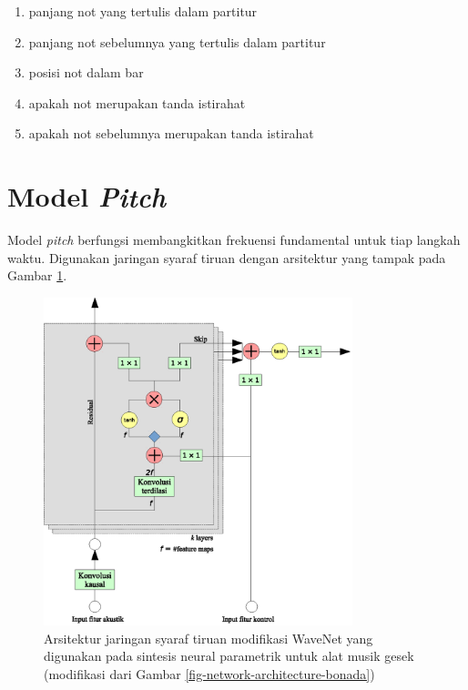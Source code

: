 \begin{enumerate}
    \item panjang not yang tertulis dalam partitur
    \item panjang not sebelumnya yang tertulis dalam partitur
    \item posisi not dalam bar
    \item apakah not merupakan tanda istirahat
    \item apakah not sebelumnya merupakan tanda istirahat
\end{enumerate}

\section{Model \textit{Pitch}}

Model \textit{pitch} berfungsi membangkitkan frekuensi fundamental untuk tiap langkah waktu. Digunakan jaringan syaraf tiruan dengan arsitektur yang tampak pada Gambar \ref{fig-network-architecture}.

\begin{figure}[h]
    \centering
    \includegraphics[width=0.8\textwidth]{resources/network-architecture.eps}
    \caption{Arsitektur jaringan syaraf tiruan modifikasi WaveNet yang digunakan pada sintesis neural parametrik untuk alat musik gesek (modifikasi dari Gambar \ref{fig-network-architecture-bonada})}\label{fig-network-architecture}
\end{figure} 

